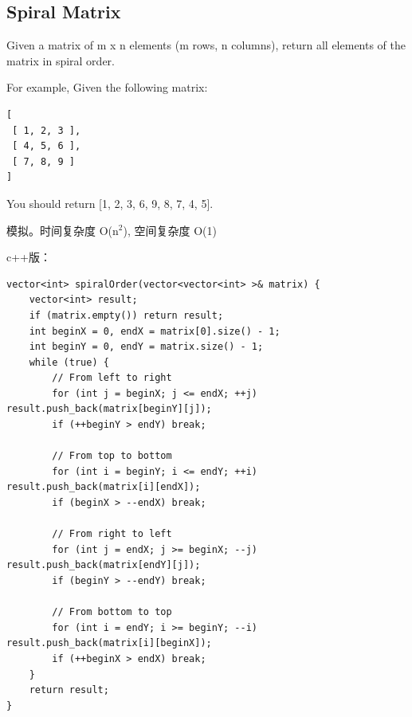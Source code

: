 \documentclass[12pt]{book}
\begin{document}
\subsection{Spiral Matrix}
\label{sec-20-1-7}
Given a matrix of m x n elements (m rows, n columns), return all elements of the matrix in spiral order.

For example,
Given the following matrix:
\lstset{language=java,label= ,caption= ,numbers=none}
\begin{lstlisting}
[
 [ 1, 2, 3 ],
 [ 4, 5, 6 ],
 [ 7, 8, 9 ]
]
\end{lstlisting}

You should return [1, 2, 3, 6, 9, 8, 7, 4, 5].

模拟。时间复杂度 O(n$^{\text{2}}$), 空间复杂度 O(1)

c++版：
\lstset{language=java,label= ,caption= ,numbers=none}
\begin{lstlisting}
vector<int> spiralOrder(vector<vector<int> >& matrix) {
    vector<int> result;
    if (matrix.empty()) return result;
    int beginX = 0, endX = matrix[0].size() - 1;
    int beginY = 0, endY = matrix.size() - 1;
    while (true) {
        // From left to right
        for (int j = beginX; j <= endX; ++j) result.push_back(matrix[beginY][j]);
        if (++beginY > endY) break;

        // From top to bottom
        for (int i = beginY; i <= endY; ++i) result.push_back(matrix[i][endX]);
        if (beginX > --endX) break;

        // From right to left
        for (int j = endX; j >= beginX; --j) result.push_back(matrix[endY][j]);
        if (beginY > --endY) break;

        // From bottom to top
        for (int i = endY; i >= beginY; --i) result.push_back(matrix[i][beginX]);
        if (++beginX > endX) break;
    }
    return result;
}
\end{lstlisting}
\lstset{language=java,label= ,caption= ,numbers=none}
\end{document}
